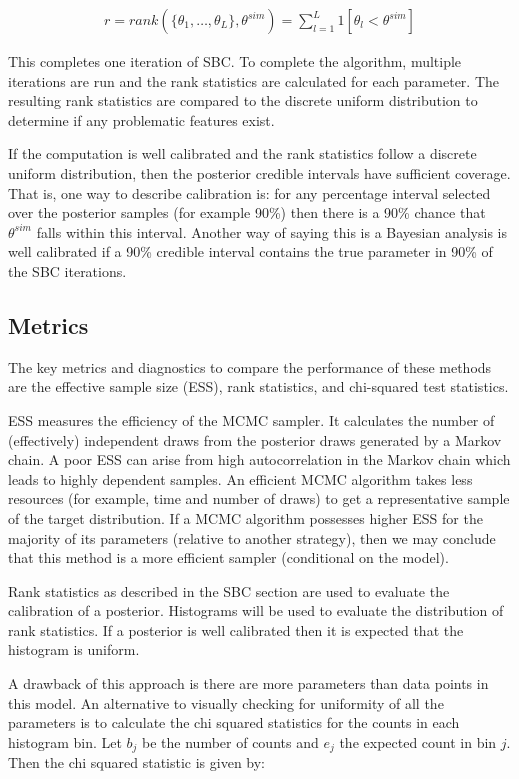 \documentclass[12pt, a4paper]{article}
\begin{document}
        $$
        \begin{aligned}
        r = rank(\{\theta_1,\dots , \theta_{L}\}, \theta^{sim}) = \sum_{l=1}^{L}1[\theta_{l} < \theta^{sim}]
        \end{aligned}
        $$

        This completes one iteration of SBC. To complete the algorithm, multiple iterations are run and the rank statistics are calculated for each parameter. The resulting rank statistics are compared to the discrete uniform distribution to determine if any problematic features exist.

        If the computation is well calibrated and the rank statistics follow a discrete uniform distribution, then the posterior credible intervals have sufficient coverage. That is, one way to describe calibration is: for any percentage interval selected over the posterior samples (for example 90\%) then there is a 90\% chance that $\theta^{sim}$ falls within this interval. Another way of saying this is a Bayesian analysis is well calibrated if a 90\% credible interval contains the true parameter in 90\% of the SBC iterations. 

    \subsection{Metrics}
        The key metrics and diagnostics to compare the performance of these methods are the effective sample size (ESS), rank statistics, and chi-squared test statistics. 

        ESS measures the efficiency of the MCMC sampler. It calculates the number of (effectively) independent draws from the posterior draws generated by a Markov chain. A poor ESS can arise from high autocorrelation in the Markov chain which leads to highly dependent samples. An efficient MCMC algorithm takes less resources (for example, time and number of draws) to get a representative sample of the target distribution. If a MCMC algorithm possesses higher ESS for the majority of its parameters (relative to another strategy), then we may conclude that this method is a more efficient sampler (conditional on the model). 
    
        Rank statistics as described in the SBC section are used to evaluate the calibration of a posterior. Histograms will be used to evaluate the distribution of rank statistics. If a posterior is well calibrated then it is expected that the histogram is uniform.
    
        A drawback of this approach is there are more parameters than data points in this model. An alternative to visually checking for uniformity of all the parameters is to calculate the chi squared statistics for the counts in each histogram bin. Let $b_j$ be the number of counts and $e_j$ the expected count in bin $j$. Then the chi squared statistic is given by:
    
\end{document}

